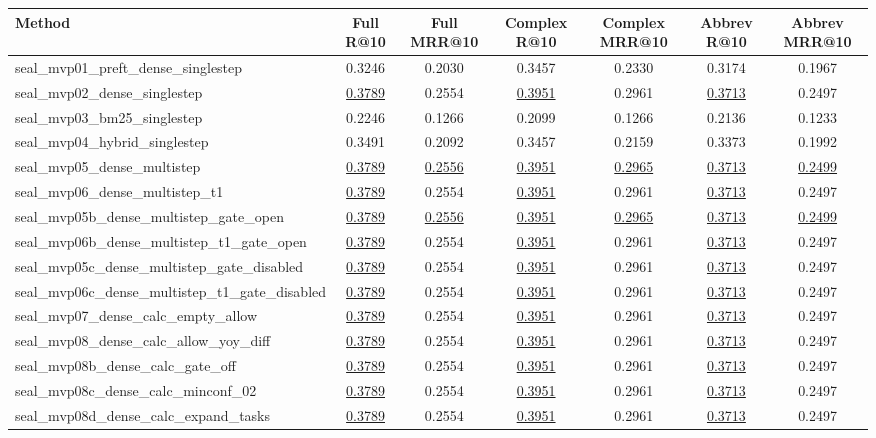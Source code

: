 \begin{tabular}{lcccccc}
\toprule
Method & Full R@10 & Full MRR@10 & Complex R@10 & Complex MRR@10 & Abbrev R@10 & Abbrev MRR@10 \\
\midrule
seal_mvp01_preft_dense_singlestep & 0.3246 & 0.2030 & 0.3457 & 0.2330 & 0.3174 & 0.1967 \\
seal_mvp02_dense_singlestep & \underline{0.3789} & 0.2554 & \underline{0.3951} & 0.2961 & \underline{0.3713} & 0.2497 \\
seal_mvp03_bm25_singlestep & 0.2246 & 0.1266 & 0.2099 & 0.1266 & 0.2136 & 0.1233 \\
seal_mvp04_hybrid_singlestep & 0.3491 & 0.2092 & 0.3457 & 0.2159 & 0.3373 & 0.1992 \\
seal_mvp05_dense_multistep & \underline{0.3789} & \underline{0.2556} & \underline{0.3951} & \underline{0.2965} & \underline{0.3713} & \underline{0.2499} \\
seal_mvp06_dense_multistep_t1 & \underline{0.3789} & 0.2554 & \underline{0.3951} & 0.2961 & \underline{0.3713} & 0.2497 \\
seal_mvp05b_dense_multistep_gate_open & \underline{0.3789} & \underline{0.2556} & \underline{0.3951} & \underline{0.2965} & \underline{0.3713} & \underline{0.2499} \\
seal_mvp06b_dense_multistep_t1_gate_open & \underline{0.3789} & 0.2554 & \underline{0.3951} & 0.2961 & \underline{0.3713} & 0.2497 \\
seal_mvp05c_dense_multistep_gate_disabled & \underline{0.3789} & 0.2554 & \underline{0.3951} & 0.2961 & \underline{0.3713} & 0.2497 \\
seal_mvp06c_dense_multistep_t1_gate_disabled & \underline{0.3789} & 0.2554 & \underline{0.3951} & 0.2961 & \underline{0.3713} & 0.2497 \\
seal_mvp07_dense_calc_empty_allow & \underline{0.3789} & 0.2554 & \underline{0.3951} & 0.2961 & \underline{0.3713} & 0.2497 \\
seal_mvp08_dense_calc_allow_yoy_diff & \underline{0.3789} & 0.2554 & \underline{0.3951} & 0.2961 & \underline{0.3713} & 0.2497 \\
seal_mvp08b_dense_calc_gate_off & \underline{0.3789} & 0.2554 & \underline{0.3951} & 0.2961 & \underline{0.3713} & 0.2497 \\
seal_mvp08c_dense_calc_minconf_02 & \underline{0.3789} & 0.2554 & \underline{0.3951} & 0.2961 & \underline{0.3713} & 0.2497 \\
seal_mvp08d_dense_calc_expand_tasks & \underline{0.3789} & 0.2554 & \underline{0.3951} & 0.2961 & \underline{0.3713} & 0.2497 \\

\end{tabular}
